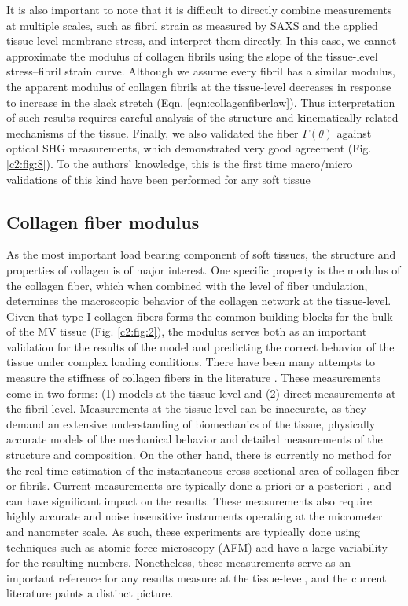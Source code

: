     
    It is also important to note that it is difficult to directly combine measurements at multiple scales, such as fibril strain as measured by SAXS and the applied tissue-level membrane stress, and interpret them directly. In this case, we cannot approximate the modulus of collagen fibrils using the slope of the tissue-level stress–fibril strain curve. Although we assume every fibril has a similar modulus, the apparent modulus of collagen fibrils at the tissue-level decreases in response to increase in the slack stretch (Eqn. \ref{eqn:collagenfiberlaw}). Thus interpretation of such results requires careful analysis of the structure and kinematically related mechanisms of the tissue. Finally, we also validated the fiber $\Gamma(\theta)$ against optical SHG measurements, which demonstrated very good agreement (Fig. \ref{c2:fig:8}). To the authors’ knowledge, this is the first time macro/micro validations of this kind have been performed for any soft tissue
    
    


\subsection{Collagen fiber modulus}

    As the most important load bearing component of soft tissues, the structure and properties of collagen is of major interest. One specific property is the modulus of the collagen fiber, which when combined with the level of fiber undulation, determines the macroscopic behavior of the collagen network at the tissue-level. Given that type I collagen fibers forms the common building blocks for the bulk of the MV tissue (Fig. \ref{c2:fig:2}), the modulus serves both as an important validation for the results of the model and predicting the correct behavior of the tissue under complex loading conditions. There have been many attempts to measure the stiffness of collagen fibers in the literature \cite{shen_stress_2008}\cite{gentleman_mechanical_2003}\cite{eppell_nano_2006}\cite{yang_mechanical_2008}\cite{yang_micromechanical_2007}\cite{wenger_mechanical_2007}. These measurements come in two forms: (1) models at the tissue-level and (2) direct measurements at the fibril-level. Measurements at the tissue-level can be inaccurate, as they demand an extensive understanding of biomechanics of the tissue, physically accurate models of the mechanical behavior and detailed measurements of the structure and composition. On the other hand, there is currently no method for the real time estimation of the instantaneous cross sectional area of collagen fiber or fibrils. Current measurements are typically done a priori \cite{gentleman_mechanical_2003} or a posteriori \cite{eppell_nano_2006}, and can have significant impact on the results. These measurements also require highly accurate and noise insensitive instruments operating at the micrometer and nanometer scale. As such, these experiments are typically done using techniques such as atomic force microscopy (AFM) and have a large variability for the resulting numbers. Nonetheless, these measurements serve as an important reference for any results measure at the tissue-level, and the current literature paints a distinct picture.


